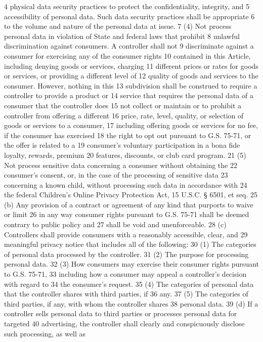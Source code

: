 4 physical data security practices to protect the confidentiality, integrity, and
5 accessibility of personal data. Such data security practices shall be appropriate
6 to the volume and nature of the personal data at issue.
7 (4) Not process personal data in violation of State and federal laws that prohibit
8 unlawful discrimination against consumers. A controller shall not
9 discriminate against a consumer for exercising any of the consumer rights
10 contained in this Article, including denying goods or services, charging
11 different prices or rates for goods or services, or providing a different level of
12 quality of goods and services to the consumer. However, nothing in this
13 subdivision shall be construed to require a controller to provide a product or
14 service that requires the personal data of a consumer that the controller does
15 not collect or maintain or to prohibit a controller from offering a different
16 price, rate, level, quality, or selection of goods or services to a consumer,
17 including offering goods or services for no fee, if the consumer has exercised
18 the right to opt out pursuant to G.S. 75-71, or the offer is related to a
19 consumer's voluntary participation in a bona fide loyalty, rewards, premium
20 features, discounts, or club card program.
21 (5) Not process sensitive data concerning a consumer without obtaining the
22 consumer's consent, or, in the case of the processing of sensitive data
23 concerning a known child, without processing such data in accordance with
24 the federal Children's Online Privacy Protection Act, 15 U.S.C. § 6501, et seq.
25 (b) Any provision of a contract or agreement of any kind that purports to waive or limit
26 in any way consumer rights pursuant to G.S. 75-71 shall be deemed contrary to public policy and
27 shall be void and unenforceable.
28 (c) Controllers shall provide consumers with a reasonably accessible, clear, and
29 meaningful privacy notice that includes all of the following:
30 (1) The categories of personal data processed by the controller.
31 (2) The purpose for processing personal data.
32 (3) How consumers may exercise their consumer rights pursuant to G.S. 75-71,
33 including how a consumer may appeal a controller's decision with regard to
34 the consumer's request.
35 (4) The categories of personal data that the controller shares with third parties, if
36 any.
37 (5) The categories of third parties, if any, with whom the controller shares
38 personal data.
39 (d) If a controller sells personal data to third parties or processes personal data for targeted
40 advertising, the controller shall clearly and conspicuously disclose such processing, as well as
